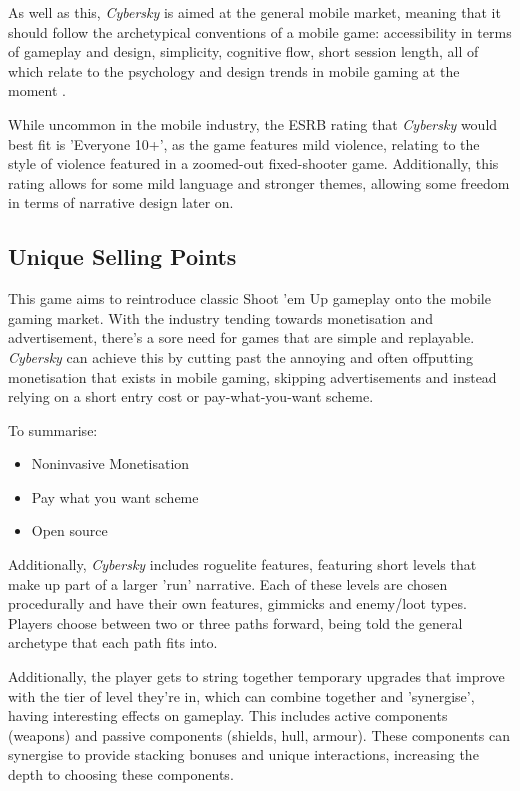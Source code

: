 \documentclass{scrartcl}
\let\citep\autocite
\begin{document}
As well as this, \emph{Cybersky} is aimed at the general mobile market, meaning that it should follow the archetypical conventions of a mobile game: accessibility in terms of gameplay and design, simplicity, cognitive flow, short session length, all of which relate to the psychology and design trends in mobile gaming at the moment \citep{Northington2018}.

While uncommon in the mobile industry, the ESRB rating that \emph{Cybersky} would best fit is 'Everyone 10+', as the game features mild violence, relating to the style of violence featured in a zoomed-out fixed-shooter game. Additionally, this rating allows for some mild language and stronger themes, allowing some freedom in terms of narrative design later on.

\subsection{Unique Selling Points}

This game aims to reintroduce classic Shoot 'em Up gameplay onto the mobile gaming market. With the industry tending towards monetisation and advertisement, there's a sore need for games that are simple and replayable. \emph{Cybersky} can achieve this by cutting past the annoying and often offputting monetisation that exists in mobile gaming, skipping advertisements and instead relying on a short entry cost or pay-what-you-want scheme.

To summarise:

\begin{itemize}
  \item Noninvasive Monetisation
  \item Pay what you want scheme
  \item Open source
\end{itemize}

Additionally, \emph{Cybersky} includes roguelite features, featuring short levels that make up part of a larger 'run' narrative. Each of these levels are chosen procedurally and have their own features, gimmicks and enemy/loot types. Players choose between two or three paths forward, being told the general archetype that each path fits into.

Additionally, the player gets to string together temporary upgrades that improve with the tier of level they're in, which can combine together and 'synergise', having interesting effects on gameplay. This includes active components (weapons) and passive components (shields, hull, armour). These components can synergise to provide stacking bonuses and unique interactions, increasing the depth to choosing these components.
\end{document}

